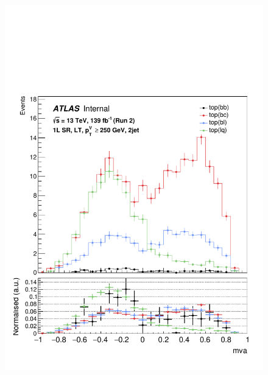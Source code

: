 \begin{figure}[h!]
\includegraphics[scale=0.253]{Images/VH/top/OneLepton_top_2lttag2jet_SR_250ptv_mva.pdf}

\end{figure}

